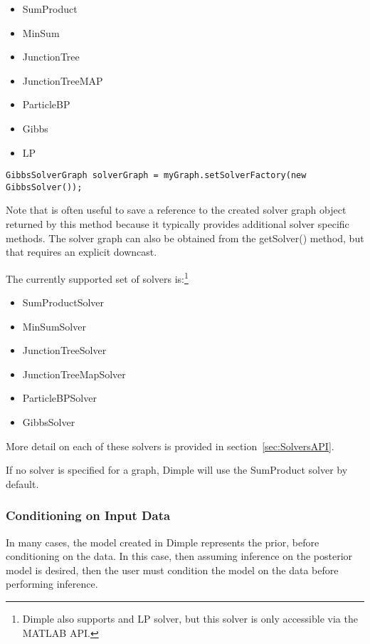 \begin{itemize}
\item SumProduct
\item MinSum
\item JunctionTree
\item JunctionTreeMAP
\item ParticleBP
\item Gibbs
\item LP
\end{itemize}

\fi

\ifjava

\begin{lstlisting}
GibbsSolverGraph solverGraph = myGraph.setSolverFactory(new GibbsSolver());
\end{lstlisting}

Note that is often useful to save a reference to the created solver graph object returned by this method because it typically provides additional solver specific methods. The solver graph can also be obtained from the getSolver() method, but that requires an explicit downcast.

The currently supported set of solvers is:\footnote{Dimple also supports and LP solver, but this solver is only accessible via the MATLAB API.}

\begin{itemize}
\item SumProductSolver
\item MinSumSolver
\item JunctionTreeSolver
\item JunctionTreeMapSolver
\item ParticleBPSolver
\item GibbsSolver
\end{itemize}

\fi

More detail on each of these solvers is provided in section~\ref{sec:SolversAPI}.

If no solver is specified for a graph, Dimple will use the SumProduct solver by default.


\subsubsection{Conditioning on Input Data}

In many cases, the model created in Dimple represents the prior, before conditioning on the data.  In this case, then assuming inference on the posterior model is desired, then the user must condition the model on the data before performing inference.


